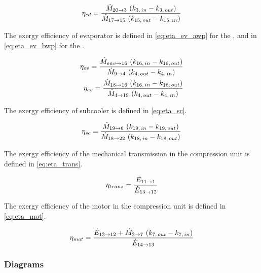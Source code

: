\begin{equation}
  \label{eq:eta_cd}
  \eta_{cd} = \dfrac{\dotM{20}{3} \, \left( k_{3,\,in} - k_{3,\,out} \right)}{\dotM{17}{15} \, \left( k_{15,\,out} - k_{15,\,in} \right)}
  \tagaddtexttwo{$\left[-\right]$}
\end{equation}

The exergy efficiency of evaporator is defined in \cref{eq:eta_ev_awp}
for the \AWP{}, and in \cref{eq:eta_ev_bwp} for the \BWP{}.

\begin{subequations}
  \begin{align}
    \eta_{ev} = \dfrac{\dotM{env}{16} \, \left( k_{16,\,in} - k_{16,\,out} \right)}{\dotM{9}{4} \, \left( k_{4,\,out} - k_{4,\,in} \right)}
    \tagaddtextthree{$\left[-\right]$} \label{eq:eta_ev_awp} \\
    \eta_{ev} = \dfrac{\dotM{18}{16} \, \left( k_{16,\,in} - k_{16,\,out} \right)}{\dotM{4}{19} \, \left( k_{4,\,out} - k_{4,\,in} \right)}
    \tagaddtextthree{$\left[-\right]$} \label{eq:eta_ev_bwp}
  \end{align}
\end{subequations}

The exergy efficiency of subcooler is defined in \cref{eq:eta_sc}.

\begin{equation}
  \label{eq:eta_sc}
  \eta_{sc} = \dfrac{\dotM{19}{6} \, \left( k_{19,\,in} - k_{19,\,out} \right)}{\dotM{18}{22} \, \left( k_{18,\,in} - k_{18,\,out} \right)}
  \tagaddtexttwo{$\left[-\right]$}
\end{equation}

The exergy efficiency of the mechanical transmission in the
compression unit is defined in \cref{eq:eta_trans}.

\begin{equation}
  \label{eq:eta_trans}
  \eta_{trans} = \dfrac{\dotE{11}{1}}{\dotE{13}{12}}
  \tagaddtexttwo{$\left[-\right]$}
\end{equation}

The exergy efficiency of the motor in the compression unit is defined
in \cref{eq:eta_mot}.

\begin{equation}
  \label{eq:eta_mot}
  \eta_{mot} = \dfrac{\dotE{13}{12} + \dotM{3}{7} \, \left( k_{7,\,out} - k_{7,\,in} \right)}{\dotE{14}{13}}
  \tagaddtexttwo{$\left[-\right]$}
\end{equation}

\subsubsection{Diagrams}
\label{sec:methodo-diagrams}


